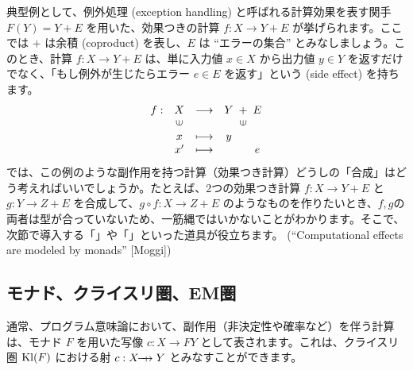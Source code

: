 \documentclass[
		head_space=20mm,
		foot_space=20mm,
		gutter=10mm,
		line_length=190mm
]{jlreq}
\begin{document}
\noindent 典型例として、例外処理 (exception handling) と呼ばれる計算効果を表す関手 $F(Y)=Y+E$ を用いた、効果つきの計算 $f:X\to Y+E$ が挙げられます。ここでは $+$ は余積 (coproduct) を表し、$E$ は ``エラーの集合'' とみなしましょう。このとき、計算 $f:X\to Y+E$ は、単に入力値 $x\in X$ から出力値 $y\in Y$ を返すだけでなく、「もし例外が生じたらエラー $e\in E$ を返す」という (side effect) を持ちます。
\[\begin{array}{cccccc}f:&X&\longrightarrow&Y\!\!&\!+\!&\!\!E\\&\rotatebox{90}{$\in$}&&&\!\!\rotatebox{90}{$\in$}\!\!\\&x&\longmapsto &y\!\!\\&x'&\longmapsto&&&\!\!e\end{array}\]
では、この例のような副作用を持つ計算（効果つき計算）どうしの「合成」はどう考えればいいでしょうか。たとえば、2つの効果つき計算 $f:X\to Y+E$ と $g:Y\to Z+E$ を合成して、$g\circ f:X\to Z+E$ のようなものを作りたいとき、$f,g$の両者は型が合っていないため、一筋縄ではいかないことがわかります。そこで、次節で導入する「」や「」といった道具が役立ちます。 (``Computational effects are modeled by monads''  [Moggi])\vspace{5pt}\\


\subsection{モナド、クライスリ圏、EM圏}

通常、プログラム意味論において、副作用（非決定性や確率など）を伴う計算は、モナド $F$ を用いた写像 $c:X\to FY$ として表されます。これは、クライスリ圏 $\mathrm{Kl}(F)$ における射 $c:X\computationrightarrow Y$ とみなすことができます。
\end{document}
